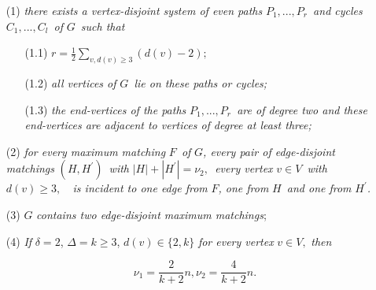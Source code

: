 \documentclass[fleqn,12pt,twoside]{article}
\begin{document}
\begin{enumerate}
\item[(1)] \textit{there exists a vertex-disjoint system of even paths }$P_{1},...,P_{r}$\textit{\ and cycles }$C_{1},...,C_{l}$\textit{\ of }$G$\textit{\ such that }

\begin{enumerate}
\item[(1.1)] $r=\frac{1}{2}\sum_{v,d(v)\geq 3}
(d(v)-2);$

\item[(1.2)] \textit{all vertices of }$G$\textit{\ lie on these paths or
cycles;}

\item[(1.3)] \textit{the end-vertices of the paths }$P_{1},...,P_{r}$\textit{\ are of degree two and these end-vertices are adjacent to vertices
of degree at least three;}

\end{enumerate}

\item[(2)] \textit{for every maximum matching }$F$\textit{\ of }$G$\textit{,
every pair of edge-disjoint matchings }$(H,H^{\prime })$\textit{\ with }$\left\vert H\right\vert +\left\vert H^{\prime }\right\vert =\nu _{2},$\textit{\ every vertex }$v\in V$\textit{\ with }$d(v)\geq 3,$\textit{\ }\textit{\ is incident to one edge from }$F$\textit{, one from }$H$\textit{\ and one from }$H^{\prime }$\textit{.}

\item[(3)] $G$ \textit{contains two edge-disjoint maximum matchings};

\item[(4)] \label{NuIN(2,k)graphs}\textit{If} $\delta =2$, $\Delta =k\geq 3$, $d(v)\in \{2,k\}$ \textit{for every vertex} $v\in V,$ \textit{then}

\begin{equation}
\nu _{1}=\frac{2}{k+2}n ,\nu _{2}=\frac{4}{k+2}n.  \label{eq3}
\end{equation}
\end{enumerate}
\end{document}
